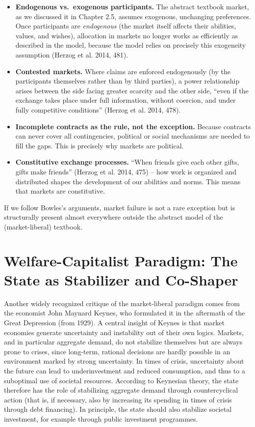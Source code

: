 \documentclass[
  british,
  a4paper,
  DIV=11,
  numbers=noendperiod,
  oneside,
  openany]{scrreprt}
\providecommand{\tightlist}{%
  \setlength{\itemsep}{0pt}\setlength{\parskip}{0pt}}
\begin{document}
\begin{itemize}
\tightlist
\item
  \textbf{Endogenous vs.~exogenous participants.} The abstract textbook
  market, as we discussed it in Chapter 2.5, assumes exogenous,
  unchanging preferences. Once participants are \emph{endogenous} (the
  market itself affects their abilities, values, and wishes), allocation
  in markets no longer works as efficiently as described in the model,
  because the model relies on precisely this exogeneity assumption
  (Herzog et al. 2014, 481).
\item
  \textbf{Contested markets.} Where claims are enforced endogenously (by
  the participants themselves rather than by third parties), a power
  relationship arises between the side facing greater scarcity and the
  other side, ``even if the exchange takes place under full information,
  without coercion, and under fully competitive conditions'' (Herzog et
  al. 2014, 478).
\item
  \textbf{Incomplete contracts as the rule, not the exception.} Because
  contracts can never cover all contingencies, political or social
  mechanisms are needed to fill the gaps. This is precisely why markets
  are political.
\item
  \textbf{Constitutive exchange processes.} ``When friends give each
  other gifts, gifts make friends'' (Herzog et al. 2014, 475) -- how
  work is organized and distributed shapes the development of our
  abilities and norms. This means that markets are constitutive.
\end{itemize}

If we follow Bowles's arguments, market failure is not a rare exception
but is structurally present almost everywhere outside the abstract model
of the (market-liberal) textbook.

\section{Welfare-Capitalist Paradigm: The State as Stabilizer and
Co-Shaper}\label{welfare-capitalist-paradigm-the-state-as-stabilizer-and-co-shaper}

Another widely recognized critique of the market-liberal paradigm comes
from the economist John Maynard Keynes, who formulated it in the
aftermath of the Great Depression (from 1929). A central insight of
Keynes is that market economies generate uncertainty and instability out
of their own logics. Markets, and in particular aggregate demand, do not
stabilize themselves but are always prone to crises, since long-term,
rational decisions are hardly possible in an environment marked by
strong uncertainty. In times of crisis, uncertainty about the future can
lead to underinvestment and reduced consumption, and thus to a
suboptimal use of societal resources. According to Keynesian theory, the
state therefore has the role of stabilizing aggregate demand through
countercyclical action (that is, if necessary, also by increasing its
spending in times of crisis through debt financing). In principle, the
state should also stabilize societal investment, for example through
public investment programmes.
\end{document}
